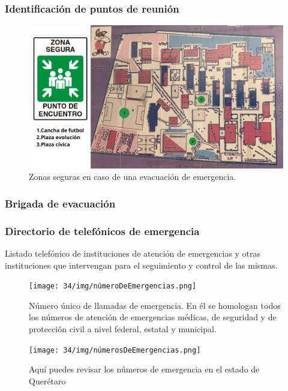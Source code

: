     
    \subsubsection{Identificación de puntos de reunión}
    
    \begin{figure}[H]
        \centering
        \includegraphics[scale=0.15]{34/img/puntosDeReunion.png}
        \caption{Zonas seguras en caso de una evacuación de emergencia.}
        \label{fig:puntosDeReunion}
    \end{figure}
    
    \subsubsection{Brigada de evacuación}
    
    \subsubsection{Directorio de telefónicos de emergencia}
    
    Listado telefónico de instituciones de atención de emergencias y otras instituciones que intervengan para el seguimiento y control de las mismas.
    
    \begin{figure}[H]
        \centering
        \texttt{[image: 34/img/númeroDeEmergencias.png]}
        \caption{Número único de llamadas de emergencia. En él se homologan todos los números de atención de emergencias médicas, de seguridad y de protección civil a nivel federal, estatal y municipal.}
        \label{fig:númeroDeEmergencias}
    \end{figure}
    
    \begin{figure}[H]
        \centering
        \texttt{[image: 34/img/númerosDeEmergencias.png]}
        \caption{Aquí puedes revisar los números de emergencia en el estado de Querétaro}
        \label{fig:númerosDeEmergencias}
    \end{figure}
    
